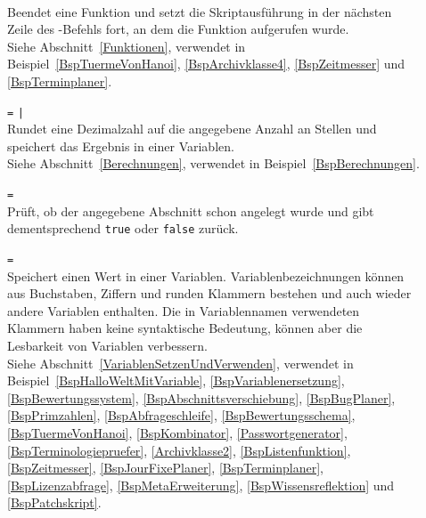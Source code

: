 \begin{description}
\item[]\mbox{}\\
Beendet eine Funktion und setzt die Skriptausführung in der nächsten Zeile des -Befehls fort, an dem die Funktion aufgerufen wurde.\\
Siehe Abschnitt~\ref{Funktionen}, verwendet in Beispiel~\ref{BspTuermeVonHanoi}, \ref{BspArchivklasse4}, \ref{BspZeitmesser} und \ref{BspTerminplaner}.

\item[]  \verb|=|  \verb=|= \\
Rundet eine Dezimalzahl auf die angegebene Anzahl an Stellen und speichert das Ergebnis in einer Variablen.\\
Siehe Abschnitt~\ref{Berechnungen}, verwendet in Beispiel~\ref{BspBerechnungen}.

\item[]  \verb|=| \\
Prüft, ob der angegebene Abschnitt schon angelegt wurde und gibt dementsprechend \verb|true| oder \verb|false| zurück.

\item[]  \verb|=| \\
Speichert einen Wert in einer Variablen. Variablenbezeichnungen können aus Buchstaben, Ziffern und runden Klammern bestehen und auch wieder andere Variablen enthalten. Die in Variablennamen verwendeten Klammern haben keine syntaktische Bedeutung, können aber die Lesbarkeit von Variablen verbessern.\\
Siehe Abschnitt~\ref{VariablenSetzenUndVerwenden}, verwendet in Beispiel~\ref{BspHalloWeltMitVariable}, \ref{BspVariablenersetzung}, \ref{BspBewertungssystem}, \ref{BspAbschnittsverschiebung}, \ref{BspBugPlaner}, \ref{BspPrimzahlen}, \ref{BspAbfrageschleife}, \ref{BspBewertungsschema}, \ref{BspTuermeVonHanoi}, \ref{BspKombinator}, \ref{Passwortgenerator}, \ref{BspTerminologiepruefer}, \ref{Archivklasse2}, \ref{BspListenfunktion}, \ref{BspZeitmesser}, \ref{BspJourFixePlaner}, \ref{BspTerminplaner}, \ref{BspLizenzabfrage}, \ref{BspMetaErweiterung}, \ref{BspWissensreflektion} und \ref{BspPatchskript}.


\end{description}
